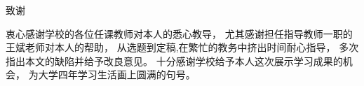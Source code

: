 \vspace{2cm}
\begin{center}
    {\heiti{}致谢}
\end{center}
\vspace{0.5cm}
{
    \par 衷心感谢学校的各位任课教师对本人的悉心教导，
    尤其感谢担任指导教师一职的王斌老师对本人的帮助，
    从选题到定稿,在繁忙的教务中挤出时间耐心指导，
    多次指出本文的缺陷并给予改良意见。
    十分感谢学校给予本人这次展示学习成果的机会，
    为大学四年学习生活画上圆满的句号。
}